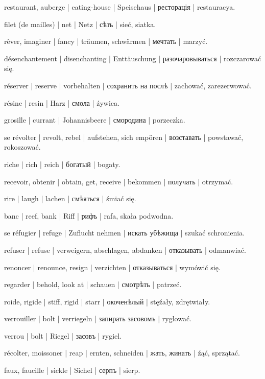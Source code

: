 \begin{outdent}{1em}
restaurant, auberge | eating-house | Speisehaus | ресторація | restauracya.

filet (de mailles) | net | Netz | сѣть | sieć, siatka.

rêver, imaginer | fancy | träumen, schwärmen | мечтать | marzyć.

\uvsubentry{}
désenchantement | disenchanting | Enttäuschung | разочаровываться | rozczarować się.

réserver | reserve | vorbehalten | сохранить на послѣ | zachować, zarezerwować.

résine | resin | Harz | смола | źywica.

grosille | currant | Johannisbeere | смородина | porzeczka.

se révolter | revolt, rebel | aufstehen, sich empören | возставать | powstawać, rokoszować.

riche | rich | reich | богатый | bogaty.

recevoir, obtenir | obtain, get, receive | bekommen | получать | otrzymać.

rire | laugh | lachen | смѣяться | śmiać się.

banc | reef, bank | Riff | рифъ | rafa, skała podwodna.

se réfugier | refuge | Zuflucht nehmen | искать убѣжища | szukać schronienia.

refuser | refuse | verweigern, abschlagen, abdanken | отказывать | odmanwiać.

\uvsubentry{}
renoncer | renounce, resign | verzichten | отказываться | wymówić się.

regarder | behold, look at | schauen | смотрѣть | patrzeć.

roide, rigide | stiff, rigid | starr | окоченѣлый | stęźały,
zdrętwiały.

verrouiller | bolt | verriegeln | запирать засовомъ | ryglować.

\uvsubentry{}
verrou | bolt | Riegel | засовъ | rygiel.

récolter, moissoner | reap | ernten, schneiden | жать,
жинать | źąć, sprzątać.

\uvsubentry{}
faux, faucille | sickle | Sichel | серпъ | sierp.


\end{outdent}

